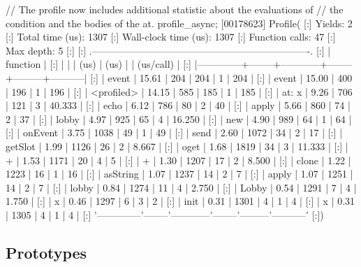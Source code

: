 \begin{urbiscript}
// The profile now includes additional statistic about the evaluations of
// the condition and the bodies of the at.
profile_async;
[00178623] Profile(
[:]  Yields:                    2
[:]  Total time (us):        1307
[:]  Wall-clock time (us):   1307
[:]  Function calls:           47
[:]  Max depth:                 5
[:]
[:]  .-------------------------------------------------------------------.
[:]  |   function   |   %
[:]  |              |        |    (us)    |  (us)  |         | (us/call) |
[:]  |--------------+--------+------------+--------+---------+-----------|
[:]  |        event |  15.61 |        204 |    204 |       1 |       204 |
[:]  |        event |  15.00 |        400 |    196 |       1 |       196 |
[:]  |   <profiled> |  14.15 |        585 |    185 |       1 |       185 |
[:]  |    at: { x } |   9.26 |        706 |    121 |       3 |    40.333 |
[:]  |         echo |   6.12 |        786 |     80 |       2 |        40 |
[:]  |        apply |   5.66 |        860 |     74 |       2 |        37 |
[:]  |        lobby |   4.97 |        925 |     65 |       4 |    16.250 |
[:]  |          new |   4.90 |        989 |     64 |       1 |        64 |
[:]  |      onEvent |   3.75 |       1038 |     49 |       1 |        49 |
[:]  |         send |   2.60 |       1072 |     34 |       2 |        17 |
[:]  |      getSlot |   1.99 |       1126 |     26 |       2 |     8.667 |
[:]  |         oget |   1.68 |       1819 |     34 |       3 |    11.333 |
[:]  |            + |   1.53 |       1171 |     20 |       4 |         5 |
[:]  |            + |   1.30 |       1207 |     17 |       2 |     8.500 |
[:]  |        clone |   1.22 |       1223 |     16 |       1 |        16 |
[:]  |     asString |   1.07 |       1237 |     14 |       2 |         7 |
[:]  |        apply |   1.07 |       1251 |     14 |       2 |         7 |
[:]  |        lobby |   0.84 |       1274 |     11 |       4 |     2.750 |
[:]  |        Lobby |   0.54 |       1291 |      7 |       4 |     1.750 |
[:]  |            x |   0.46 |       1297 |      6 |       3 |         2 |
[:]  |         init |   0.31 |       1301 |      4 |       1 |         4 |
[:]  |            x |   0.31 |       1305 |      4 |       1 |         4 |
[:]  '--------------'--------'------------'--------'---------'-----------'
[:])
\end{urbiscript}

\subsection{Prototypes}


